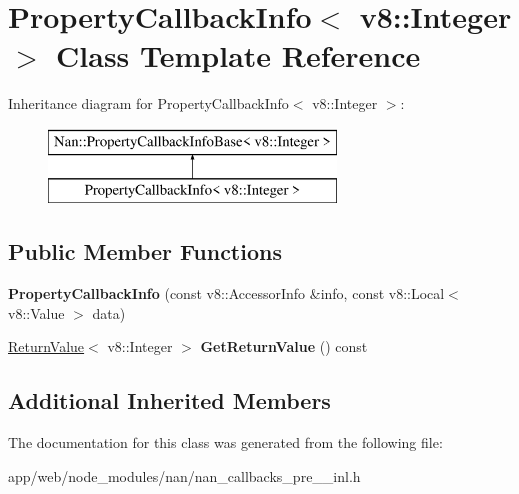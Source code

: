 \hypertarget{class_property_callback_info_3_01v8_1_1_integer_01_4}{}\section{Property\+Callback\+Info$<$ v8\+:\+:Integer $>$ Class Template Reference}
\label{class_property_callback_info_3_01v8_1_1_integer_01_4}
Inheritance diagram for Property\+Callback\+Info$<$ v8\+:\+:Integer $>$\+:\begin{figure}[H]
\begin{center}
\leavevmode
\includegraphics[height=2.000000cm]{class_property_callback_info_3_01v8_1_1_integer_01_4}
\end{center}
\end{figure}
\subsection*{Public Member Functions}
\begin{DoxyCompactItemize}
\item 
\mbox{\label{class_property_callback_info_3_01v8_1_1_integer_01_4_a7c4754e2fe76eef7ceec11409f91c749}} 
{\bfseries Property\+Callback\+Info} (const v8\+::\+Accessor\+Info \&info, const v8\+::\+Local$<$ v8\+::\+Value $>$ data)
\item 
\mbox{\label{class_property_callback_info_3_01v8_1_1_integer_01_4_acbaf12120d3b288eaf219502ab428f2f}} 
\hyperlink{class_return_value}{Return\+Value}$<$ v8\+::\+Integer $>$ {\bfseries Get\+Return\+Value} () const
\end{DoxyCompactItemize}
\subsection*{Additional Inherited Members}


The documentation for this class was generated from the following file\+:\begin{DoxyCompactItemize}
\item 
app/web/node\+\_\+modules/nan/nan\+\_\+callbacks\+\_\+pre\+\_\+\_\+inl.\+h\end{DoxyCompactItemize}
